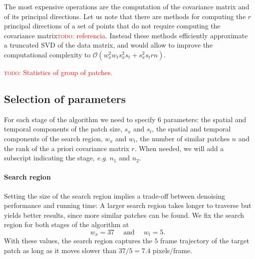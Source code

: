 \documentclass[10pt, journal, twocolumn, final, a4paper]{IEEEtran}
\newcommand{\eg}{\emph{e.g}. } \newcommand{\Eg}{\emph{E.g}. }
\newcommand{\todo}[1]{\textcolor{red}{\noindent\textsc{todo}: #1}}
\begin{document}
The most expensive operations are the computation of the covariance matrix and
of its principal directions.
Let us note that there are methods for computing the $r$ principal directions
of a set of points that do not require computing the covariance matrix\todo{referencia}. Instead
these methods efficiently approximate a truncated SVD of the data matrix, and would 
allow to improve the computational complexity to $\mathcal O(w_x^2 w_t s_x^2
s_t + s_x^2s_trn)$.

\todo{Statistics of group of patches.}

\subsection{Selection of parameters}
\label{sec:parameters}

For each stage of the algorithm we need to specify 6 parameters: the spatial
and temporal components of the patch size, $s_x$ and $s_t$, the spatial and
temporal components of the search region, $w_x$ and $w_t$, the number of similar
patches $n$ and the rank of the a priori covariance matrix $r$.
When needed, we will add a subscript indicating the stage, \eg
$n_{1}$ and $n_{2}$.

\paragraph{Search region} Setting the size of the search region implies a
trade-off between denoising performance and running time: A larger search
region takes longer to traverse but yields better results, since more
similar patches can be found. We fix the search
region for both stages of the algorithm at 
\begin{equation}
w_x = 37 \quad \text{ and } \quad w_t = 5.
\label{eq:search_region_parameters}
\end{equation}
With these values, the search region captures the $5$ frame trajectory of the
target patch as long as it moves slower than $37/5 = 7.4$
pixels/frame.
\end{document}
